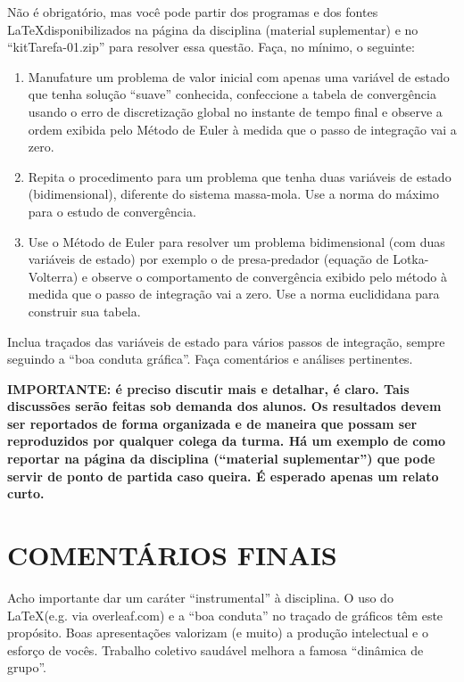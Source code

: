 \documentclass{article}
\begin{document}
Não é obrigatório, mas você pode partir dos programas e dos fontes \LaTeX\quad   disponibilizados na página da disciplina (material suplementar) e no ``kitTarefa-01.zip'' para resolver essa questão. Faça, no mínimo, o seguinte:

\begin{enumerate}
 \item Manufature um problema de valor inicial com apenas uma variável de estado que tenha solução ``suave'' conhecida, confeccione a tabela de convergência usando o erro de discretização global no instante de tempo final e observe a ordem exibida pelo Método de Euler à medida que o passo de integração vai a zero.
 \item Repita o procedimento para um problema que tenha duas variáveis de estado (bidimensional), diferente do sistema massa-mola. Use a norma do máximo para o estudo de convergência.
 \item Use o Método de Euler para resolver um problema bidimensional (com duas variáveis de estado) por exemplo o de presa-predador (equação de Lotka-Volterra) e observe o comportamento de convergência exibido pelo método à medida que o passo de integração vai a zero. Use a norma euclididana para construir sua tabela.
\end{enumerate}

\vspace{3mm}
Inclua traçados das variáveis de estado para vários passos de integração, sempre seguindo a ``boa conduta gráfica''. Faça comentários e análises pertinentes.

\vspace{3mm}\noindent
{\bf IMPORTANTE: é preciso discutir mais e detalhar, é claro. Tais discussões serão feitas sob demanda dos alunos. Os resultados devem ser reportados de forma organizada e de maneira que possam ser reproduzidos por qualquer colega da turma. Há um exemplo de como reportar na página da disciplina (``material suplementar'') que pode servir de ponto de partida caso queira. É esperado apenas um relato curto.}

\section{COMENTÁRIOS FINAIS}
    Acho importante dar um caráter ``instrumental'' à disciplina. O uso do \LaTeX\quad (e.g. via overleaf.com) e a ``boa conduta'' no traçado de gráficos têm este propósito. Boas apresentações valorizam (e muito) a produção intelectual e o esforço de vocês. Trabalho coletivo saudável melhora a famosa ``dinâmica de grupo''.
\end{document}
